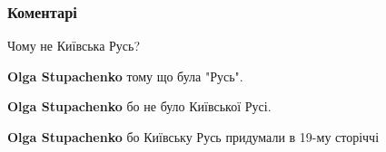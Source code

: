  
 
 
 
 
\subsubsection{Коментарі}

\begin{itemize}
 
Чому не Київська Русь?

\begin{itemize}
 
\textbf{Olga Stupachenko} тому що була "Русь".

 
\textbf{Olga Stupachenko} бо не було Київської Русі.

 
\textbf{Olga Stupachenko} бо Київську Русь придумали в 19-му сторіччі

 

\end{itemize}
\end{itemize}
